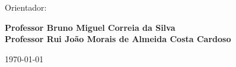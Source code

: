 \vspace{0,5cm}
\begin{center}
  \begin{normalsize}
    \begin{large}
      Orientador:
    \end{large}
  \end{normalsize}
\end{center}

\vspace{0.2cm}
\begin{center}
  \begin{large}
    \textbf{Professor Bruno Miguel Correia da Silva} \\
    \textbf{Professor Rui João Morais de Almeida Costa Cardoso} \\
  \end{large}
\end{center}

\vspace{0.5cm}
\begin{center}
  \begin{normalsize}
    \today
  \end{normalsize}
\end{center}
